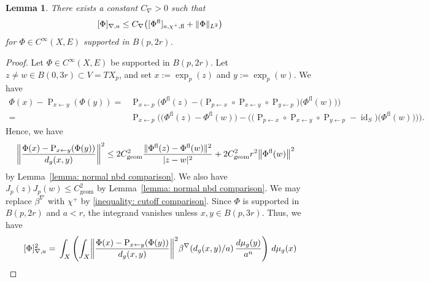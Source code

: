 \documentclass[a4paper,oneside,12pt]{amsart}
\theoremstyle{plain}
\newtheorem{lemma}[theorem]{Lemma}
\theoremstyle{definition}
\theoremstyle{remark}
\DeclarePairedDelimiter{\abs}{\lvert}{\rvert}
\DeclarePairedDelimiter{\norm}{\lVert}{\rVert}
\DeclarePairedDelimiter{\seminorm}{\lbrack}{\rbrack}
\DeclareMathOperator{\id}{id}
\newcommand{\dvol}{d\mu}
\newcommand{\paralleltransport}[2]{\operatorname{P}_{#2 \gets #1}}
\newcommand{\Ltwonorm}[2][L^2]{\norm{#2}_{#1}}
\newcommand{\mesoscopicdifferenceseminorm}[2][a]{\seminorm{#2}_{\nabla,#1}}
\newcommand{\flatmesoscopicdifferenceseminorm}[3][a]{\seminorm{#3}_{#1,#2,\mathrm{fl}}}
\newcommand{\cutoff}{\beta}
\newcommand{\cutoffnabla}{\cutoff^{\nabla}}
\newcommand{\cutoffupper}{\chi^+}
\newcommand{\flatmodel}[1]{#1^{\mathrm{fl}}}
\newcommand{\constantgeometric}{C_{\mathrm{geom}}}
\newcommand{\constantnabla}{C_{\nabla}}
\begin{document}
\begin{lemma}\label{lemma: comparison of difference seminorms}
  There exists a constant $\constantnabla > 0$ such that
  \begin{equation}
    \mesoscopicdifferenceseminorm{\Phi} \le \constantnabla \big( \flatmesoscopicdifferenceseminorm{\cutoffupper}{\flatmodel{\Phi}} + \Ltwonorm{\Phi} \big)
  \end{equation}
  for $\Phi \in C^{\infty}(X,E)$ supported in $B(p,2r)$.
\end{lemma}
\begin{proof}
  Let $\Phi \in C^{\infty}(X,E)$ be supported in $B(p,2r)$.
  Let $z \ne w \in B(0,3r) \subset V = TX_p$, and set $x := \exp_p(z)$ and $y := \exp_p(w)$.
  We have
  \begin{equation}
    \begin{aligned}
    \Phi(x) - \paralleltransport{y}{x}(\Phi(y)) ={}& \paralleltransport{p}{x}\big(\flatmodel{\Phi}(z) - \big(\paralleltransport{x}{p} \circ \paralleltransport{y}{x} \circ \paralleltransport{p}{y}\big)\big(\flatmodel{\Phi}(w)\big) \big) \\
    ={}& \paralleltransport{p}{x}\big(\big(\flatmodel{\Phi}(z) - \flatmodel{\Phi}(w)\big) - \big(\big(\paralleltransport{x}{p} \circ \paralleltransport{y}{x} \circ \paralleltransport{p}{y} - \id_S \big) \big(\flatmodel{\Phi}(w)\big)\big)\big).
    \end{aligned}
  \end{equation}
  Hence, we have
  \begin{equation}
    \begin{aligned}
      \norm*{\frac{\Phi(x) - \paralleltransport{y}{x}(\Phi(y))}{d_g(x,y)}}^2 \le{}& 2 \constantgeometric^2 \frac{\norm{\flatmodel{\Phi}(z)-\flatmodel{\Phi}(w)}^2}{\abs{z-w}^2} + 2 \constantgeometric^2 r^2 \norm*{\flatmodel{\Phi}(w)}^2
    \end{aligned}
  \end{equation}
  by Lemma~\ref{lemma: normal nbd comparison}.
  We also have $J_p(z) J_p(w) \le \constantgeometric^2$ by Lemma~\ref{lemma: normal nbd comparison}.
  We may replace $\cutoffnabla$ with $\cutoffupper$ by \eqref{inequality: cutoff comparison}.
  Since $\Phi$ is supported in $B(p,2r)$ and $a < r$, the integrand vanishes unless $x,y \in B(p,3r)$.
  Thus, we have
  \begin{equation}
    \begin{aligned}
    \mesoscopicdifferenceseminorm{\Phi}^2 ={}& \int_X \left(\int_X \norm*{\frac{\Phi(x) - \paralleltransport{y}{x}(\Phi(y))}{d_g(x,y)}}^2 \cutoffnabla(d_g(x,y)/a) \,\frac{\dvol_g(y)}{a^n}\right) \,\dvol_g(x) \\

\end{aligned}
\end{equation}
\end{proof}
\end{document}
